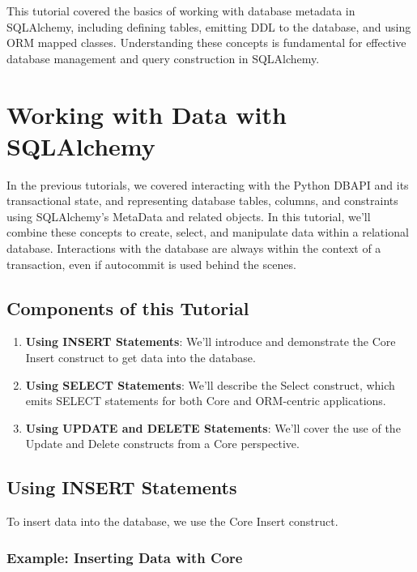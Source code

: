 \documentclass[
  letterpaper,
  DIV=11,
  numbers=noendperiod]{scrreprt}
\providecommand{\tightlist}{%
  \setlength{\itemsep}{0pt}\setlength{\parskip}{0pt}}\usepackage{longtable,booktabs,array}
\begin{document}
This tutorial covered the basics of working with database metadata in
SQLAlchemy, including defining tables, emitting DDL to the database, and
using ORM mapped classes. Understanding these concepts is fundamental
for effective database management and query construction in SQLAlchemy.

\section{Working with Data with
SQLAlchemy}\label{working-with-data-with-sqlalchemy}

In the previous tutorials, we covered interacting with the Python DBAPI
and its transactional state, and representing database tables, columns,
and constraints using SQLAlchemy's MetaData and related objects. In this
tutorial, we'll combine these concepts to create, select, and manipulate
data within a relational database. Interactions with the database are
always within the context of a transaction, even if autocommit is used
behind the scenes.

\subsection{Components of this
Tutorial}\label{components-of-this-tutorial}

\begin{enumerate}
\def\labelenumi{\arabic{enumi}.}
\tightlist
\item
  \textbf{Using INSERT Statements}: We'll introduce and demonstrate the
  Core Insert construct to get data into the database.
\item
  \textbf{Using SELECT Statements}: We'll describe the Select construct,
  which emits SELECT statements for both Core and ORM-centric
  applications.
\item
  \textbf{Using UPDATE and DELETE Statements}: We'll cover the use of
  the Update and Delete constructs from a Core perspective.
\end{enumerate}

\subsection{Using INSERT Statements}\label{using-insert-statements}

To insert data into the database, we use the Core Insert construct.

\subsubsection{Example: Inserting Data with
Core}\label{example-inserting-data-with-core}
\end{document}
